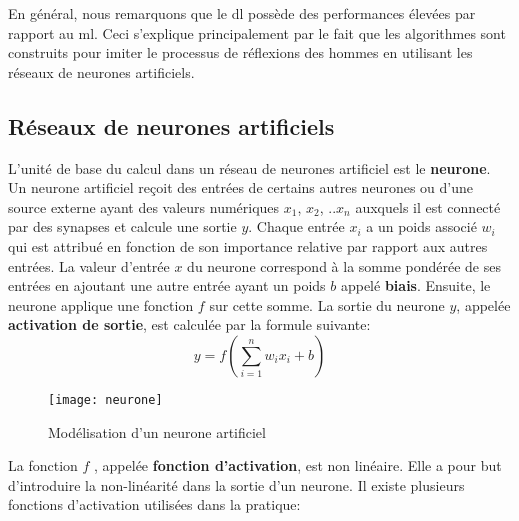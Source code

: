 En général, nous remarquons que le \acrshort{dl} possède des performances élevées par rapport au \acrshort{ml}. Ceci s’explique principalement par le fait que les algorithmes sont construits pour imiter le processus de réflexions des hommes en utilisant les réseaux de neurones artificiels.


    \subsection{Réseaux de neurones artificiels}
    L’unité de base du calcul dans un réseau de neurones artificiel est le \textbf{neurone}. Un neurone artificiel reçoit des entrées de certains autres neurones ou d’une source externe ayant des valeurs numériques $x_1$, $x_2$, ..$x_n$ auxquels il est connecté par des synapses et calcule une sortie $y$. Chaque entrée $x_i$ a un poids associé $w_i$ qui est attribué en fonction de son importance relative par rapport aux autres entrées. La valeur d’entrée $x$ du neurone correspond à la somme pondérée de ses entrées en ajoutant une autre entrée ayant un poids $b$ appelé \textbf{biais}. Ensuite, le neurone applique une fonction $f$ sur cette somme. La sortie du neurone $y$, appelée \textbf{activation de sortie}, est calculée par la formule suivante: 
    \begin{equation}\label{eq:1}
        y = f(\sum_{i = 1}^{n}w_{i}x_{i} + b)
    \end{equation}
    \begin{figure}[H]
        \centering
        \texttt{[image: neurone]}
        \caption{Modélisation d'un neurone artificiel}
    \end{figure}
    La fonction $f$ , appelée \textbf{fonction d’activation}, est non linéaire. Elle a pour but d’introduire la non-linéarité dans la sortie d’un neurone. Il existe plusieurs fonctions d’activation utilisées dans la pratique:
